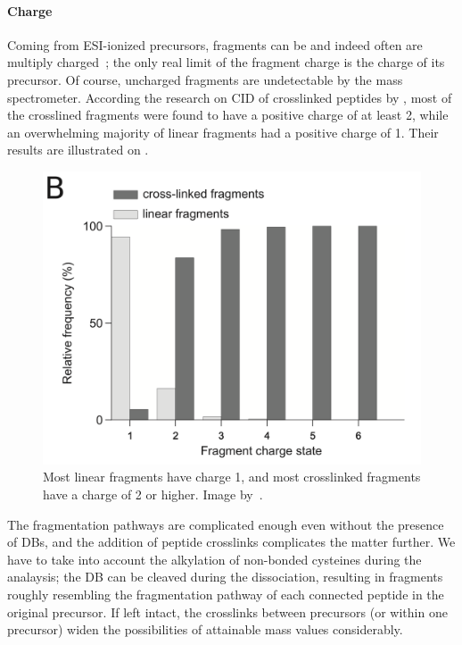 \paragraph{Charge} Coming from ESI-ionized precursors, fragments can be and indeed often are multiply charged~\cite{katta1991use, michalski2012systematic}; the only real limit of the fragment charge is the charge of its precursor. Of course, uncharged fragments are undetectable by the mass spectrometer. According the research on CID of crosslinked peptides by \citet{giese2016study}, most of the crosslined fragments were found to have a positive charge of at least 2, while an overwhelming majority of linear fragments had a positive charge of 1. Their results are illustrated on .

\begin{figure}
  \centering
  \includegraphics[width=.5\linewidth]{img/crosslink-charge.png}
  \caption{Most linear fragments have charge 1, and most crosslinked fragments have a charge of 2 or higher. Image by~\citet{giese2016study}.}\label{fig:crosslink-charge}
\end{figure}

The fragmentation pathways are complicated enough even without the presence of DBs, and the addition of peptide crosslinks complicates the matter further. We have to take into account the alkylation of non-bonded cysteines during the analaysis; the DB can be cleaved during the dissociation, resulting in fragments roughly resembling the fragmentation pathway of each connected peptide in the original precursor. If left intact, the crosslinks between precursors (or within one precursor) widen the possibilities of attainable mass values considerably.

